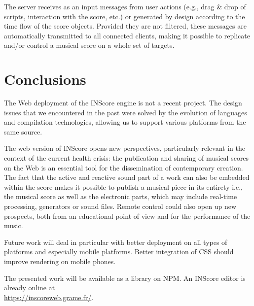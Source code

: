 \documentclass{article}
\begin{document}
The server receives as an input messages from user actions (e.g., drag \& drop of scripts, interaction with the score, etc.) or generated by design according to the time flow of the score objects. Provided they are not filtered, these messages are automatically transmitted to all connected clients, making it possible to replicate and/or control a musical score on a whole set of targets.


\section{Conclusions}

The Web deployment of the INScore engine is not a recent project. The design issues that we encountered in the past were solved by the evolution of languages and compilation technologies, allowing us to support various platforms from the same source.

The web version of INScore opens new perspectives, particularly relevant in the context of the current health crisis: the publication and sharing of musical scores on the Web is an essential tool for the dissemination of contemporary creation. 
The fact that the active and reactive sound part of a work can also be embedded within the score makes it possible to publish a musical piece in its entirety i.e., the musical score as well as the electronic parts, which may include real-time processing, generators or sound files. Remote control could also open up new prospects, both from an educational point of view and for the performance of the music.

Future work will deal in particular with better deployment on all types of platforms and especially mobile platforms. Better integration of CSS should improve rendering on mobile phones.

The presented work will be available as a library on NPM. An INScore editor is already online at\\
\url{https://inscoreweb.grame.fr/}.



\balance

\end{document}
